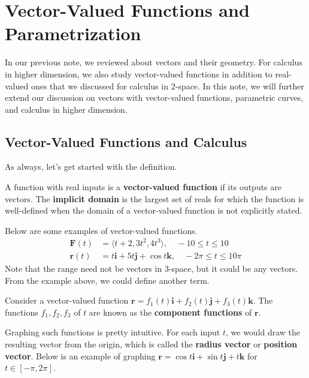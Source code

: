 \documentclass[../../../main.tex]{subfiles}
\begin{document}
\chapter{Vector-Valued Functions and Parametrization}

In our previous note, we reviewed about vectors and their geometry.
For calculus in higher dimension, we also study vector-valued
functions in addition to real-valued ones that we discussed for
calculus in 2-space. In this note, we will further extend our
discussion on vectors with vector-valued functions, parametric
curves, and calculus in higher dimension.

\section{Vector-Valued Functions and Calculus}

As always, let's get started with the definition.

\begin{definition}{}{}
A function with real inputs is a \textbf{vector-valued function}
if its outputs are vectors. The \textbf{implicit domain} is the
largest set of reals for which the function is well-defined
when the domain of a vector-valued function is not explicitly
stated.
\end{definition}

Below are some examples of vector-valued functions.
\begin{align*}
    \mathbf{F}(t) &= \langle t + 2, 3t^2, 4t^3 \rangle,
        \quad -10 \leq t \leq 10 \\
    \mathbf{r}(t) &= t \mathbf{i} + 5t \mathbf{j} + \cos t \mathbf{k},
        \quad -2\pi \leq t \leq 10\pi
\end{align*}
Note that the range need not be vectors in 3-space, but it could
be any vectors. From the example above, we could define another term.

\begin{definition}{}{}
Consider a vector-valued function $\mathbf{r} = f_1 (t) \mathbf{i}
+ f_2 (t) \mathbf{j} + f_3 (t) \mathbf{k}$. The functions $f_1, f_2,
f_3$ of $t$ are known as the \textbf{component functions} of
$\mathbf{r}$.
\end{definition}

Graphing such functions is pretty intuitive. For each input $t$,
we would draw the resulting vector from the origin, which is called
the \textbf{radius vector} or \textbf{position vector}. Below is an
example of graphing $\mathbf{r} = \cos t \mathbf{i} +
\sin t \mathbf{j} + t \mathbf{k}$ for $t \in [-\pi, 2\pi]$.
\end{document}
